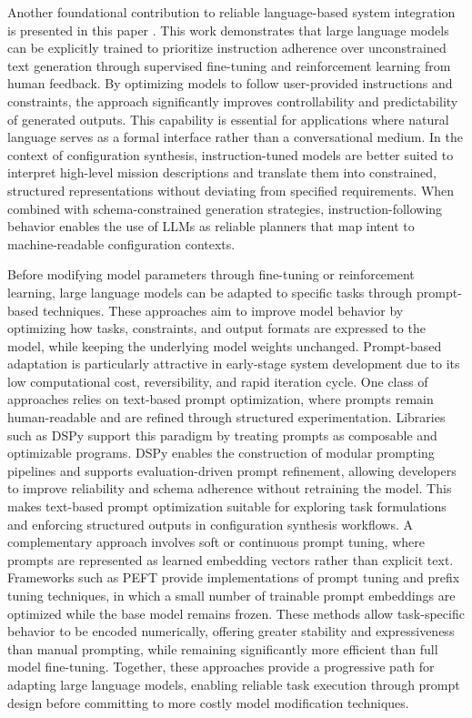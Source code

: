 Another foundational contribution to reliable language-based system integration is presented in this paper \cite{ouyang2022instructgpt}. This work demonstrates that large language models can be explicitly trained to prioritize instruction adherence over 
unconstrained text generation through supervised fine-tuning and reinforcement learning from human feedback. By optimizing models to 
follow user-provided instructions and constraints, the approach significantly improves controllability and predictability of generated 
outputs. This capability is essential for applications where natural language serves as a formal interface rather than a conversational medium.
In the context of configuration synthesis, instruction-tuned models are better suited to interpret high-level mission descriptions and translate
them into constrained, structured representations without deviating from specified requirements. When combined with schema-constrained 
generation strategies, instruction-following behavior enables the use of LLMs as reliable planners that map intent to machine-readable 
configuration contexts.

Before modifying model parameters through fine-tuning or reinforcement learning, large language models can be adapted to specific tasks
through prompt-based techniques. These approaches aim to improve model behavior by optimizing how tasks, constraints, and output formats 
are expressed to the model, while keeping the underlying model weights unchanged. Prompt-based adaptation is particularly attractive in 
early-stage system development due to its low computational cost, reversibility, and rapid iteration cycle.
One class of approaches relies on text-based prompt optimization, where prompts remain human-readable and are refined through structured 
experimentation. Libraries such as DSPy \cite{khattab2023dspy} support this paradigm by treating prompts as composable and optimizable programs. DSPy enables the 
construction of modular prompting pipelines and supports evaluation-driven prompt refinement, allowing developers to improve reliability and 
schema adherence without retraining the model. This makes text-based prompt optimization suitable for exploring task formulations and enforcing 
structured outputs in configuration synthesis workflows.
A complementary approach involves soft or continuous prompt tuning, where prompts are represented as learned embedding vectors rather than 
explicit text. Frameworks such as PEFT provide implementations of prompt tuning and prefix tuning techniques, in which a small number of trainable
prompt embeddings are optimized while the base model remains frozen. These methods allow task-specific behavior to be encoded numerically, offering
greater stability and expressiveness than manual prompting, while remaining significantly more efficient than full model fine-tuning.
Together, these approaches provide a progressive path for adapting large language models, enabling reliable task execution through prompt design
before committing to more costly model modification techniques.

